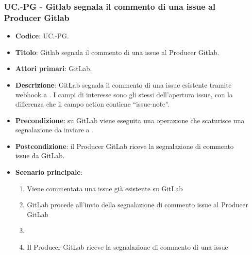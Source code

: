 \subsubsection{UC\theuccount.\thesubuccount-PG - Gitlab segnala il commento di una issue al Producer Gitlab}
\begin{itemize}
    \item \textbf{Codice}: UC\theuccount.\thesubuccount-PG.
    \item \textbf{Titolo}: Gitlab segnala il commento di una issue al Producer Gitlab.
    \item \textbf{Attori primari}: GitLab.
    \item \textbf{Descrizione}: GitLab segnala il commento di una issue esistente tramite webhook a \progetto.
    I campi di interesse sono gli stessi dell'apertura issue, con la differenza che il campo action contiene ``issue-note''.
    \item \textbf{Precondizione}: su GitLab viene eseguita una operazione che scaturisce una
    segnalazione da inviare a \progetto.
    \item \textbf{Postcondizione}: il Producer GitLab riceve la segnalazione di commento issue da GitLab.
    \item \textbf{Scenario principale}:
    \begin{enumerate}
        \item Viene commentata una issue già esistente su GitLab
        \item GitLab procede all'invio della segnalazione di commento issue al Producer GitLab
        \item \item Il Producer GitLab riceve la segnalazione di commento di una issue
    \end{enumerate}

\end{itemize}


